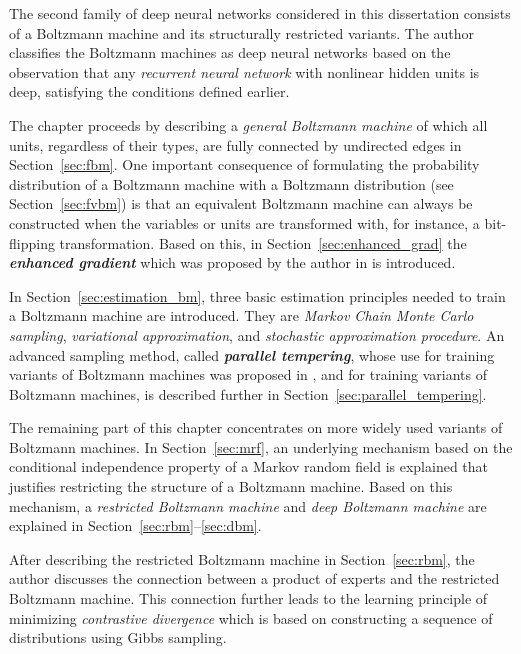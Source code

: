 \documentclass[dissertation,nocontribution,draft*]{aaltoseries}
\begin{document}
The second family of deep neural networks considered in this
dissertation consists of a Boltzmann machine and its
structurally restricted variants. The author classifies the
Boltzmann machines as deep neural networks based on the
observation that any \textit{recurrent neural network} with
nonlinear hidden units is deep, satisfying the 
conditions defined earlier.

The chapter proceeds by describing a \textit{general
Boltzmann machine} of which all units, regardless of their
types, are fully connected by undirected edges in
Section~\ref{sec:fbm}. One important consequence of
formulating the probability distribution of a Boltzmann
machine with a Boltzmann distribution (see
Section~\ref{sec:fvbm}) is that an equivalent Boltzmann
machine can always be constructed when the variables or
units are transformed with, for instance, a bit-flipping
transformation. Based on this, in
Section~\ref{sec:enhanced_grad} the
\textbf{\textit{enhanced gradient}} which was proposed by
the author in  is introduced.

In Section~\ref{sec:estimation_bm}, three basic estimation
principles needed to train a Boltzmann machine are
introduced. They are \textit{Markov Chain Monte Carlo
sampling}, \textit{variational approximation}, and
\textit{stochastic approximation procedure}. An advanced
sampling method, called \textbf{\textit{parallel
tempering}}, whose use for training variants of Boltzmann
machines was proposed in ,
 and  for
training variants of Boltzmann machines, is described
further in Section~\ref{sec:parallel_tempering}.

The remaining part of this chapter concentrates on more
widely used variants of Boltzmann machines. In
Section~\ref{sec:mrf}, an underlying mechanism based on the
conditional independence property of a Markov random field
is explained that justifies restricting the structure of a
Boltzmann machine. Based on this mechanism, a
\textit{restricted Boltzmann machine} and \textit{deep
Boltzmann machine} are explained in
Section~\ref{sec:rbm}--\ref{sec:dbm}.

After describing the restricted Boltzmann machine in
Section~\ref{sec:rbm}, the author discusses the connection
between a product of experts and the restricted Boltzmann
machine. This connection further leads to the learning
principle of minimizing \textit{contrastive divergence}
which is based on constructing a sequence of distributions
using Gibbs sampling.
\end{document}

